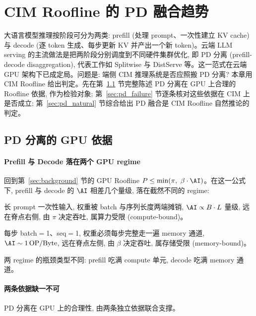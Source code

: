 \section{CIM Roofline 的 PD 融合趋势}
\label{sec:pd_fusion}

大语言模型推理按阶段可分为两类: prefill (处理 prompt、一次性建立 KV cache) 与 decode (逐 token 生成、每步更新 KV 并产出一个新 token)。云端 LLM serving 的主流做法是把两阶段分别调度到不同硬件集群优化, 即 PD 分离 (prefill-decode disaggregation), 代表工作如 Splitwise 与 DistServe 等。这一范式在云端 GPU 架构下已成定局。问题是: 端侧 CIM 推理系统是否应照搬 PD 分离? 本章用 CIM Roofline 给出判定。先在第~\ref{sec:gpu_pd_rationale} 节完整陈述 PD 分离在 GPU 上合理的 Roofline 依据, 作为检验对象; 第~\ref{sec:pd_failure} 节逐条核对这些依据在 CIM 上是否成立; 第~\ref{sec:pd_natural} 节综合给出 PD 融合是 CIM Roofline 自然推论的判定。

\subsection{PD 分离的 GPU 依据}
\label{sec:gpu_pd_rationale}

\paragraph{Prefill 与 Decode 落在两个 GPU regime}
回到第~\ref{sec:background} 节的 GPU Roofline $P \le \min(\pi,\ \beta\cdot\AI)$。在这一公式下, prefill 与 decode 的 $\AI$ 相差几个量级, 落在截然不同的 regime:

\begin{description}[leftmargin=*, itemsep=2pt]
    \item[\textbf{Prefill (算力受限)}:] 长 prompt 一次性输入, 权重被 batch 与序列长度两端摊销, $\AI \propto B \cdot L$ 量级, 远在脊点右侧, 由 $\pi$ 决定吞吐, 属算力受限 (compute-bound)。
    \item[\textbf{Decode (存储受限)}:] 每步 batch$=$1、seq$=$1, 权重必须每步完整走一遍 memory 通道, $\AI \sim 1\,\mathrm{OP/Byte}$, 远在脊点左侧, 由 $\beta$ 决定吞吐, 属存储受限 (memory-bound)。
\end{description}

两 regime 的瓶颈类型不同: prefill 吃满 compute 单元, decode 吃满 memory 通道。

\paragraph{两条依据缺一不可}
PD 分离在 GPU 上的合理性, 由两条独立依据联合支撑。

